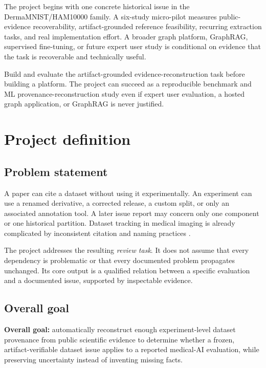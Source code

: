 \documentclass[11pt,a4paper]{article}
\begin{document}
The project begins with one concrete historical issue in the DermaMNIST/HAM10000 family. A six-study micro-pilot measures public-evidence recoverability, artifact-grounded reference feasibility, recurring extraction tasks, and real implementation effort. A broader graph platform, GraphRAG, supervised fine-tuning, or future expert user study is conditional on evidence that the task is recoverable and technically useful.

\begin{decisionbox}[title=Current commitment]
Build and evaluate the artifact-grounded evidence-reconstruction task before building a platform. The project can succeed as a reproducible benchmark and ML provenance-reconstruction study even if expert user evaluation, a hosted graph application, or GraphRAG is never justified.
\end{decisionbox}

\clearpage
\tableofcontents
\clearpage
{}

\section{Project definition}
\label{sec:project}
\subsection{Problem statement}
A paper can cite a dataset without using it experimentally. An experiment can use a renamed derivative, a corrected release, a custom split, or only an associated annotation tool. A later issue report may concern only one component or one historical partition. Dataset tracking in medical imaging is already complicated by inconsistent citation and naming practices \cite{sourget2024,copycats}.

The project addresses the resulting \emph{review task}. It does not assume that every dependency is problematic or that every documented problem propagates unchanged. Its core output is a qualified relation between a specific evaluation and a documented issue, supported by inspectable evidence.

\subsection{Overall goal}
\textbf{Overall goal:} automatically reconstruct enough experiment-level dataset provenance from public scientific evidence to determine whether a frozen, artifact-verifiable dataset issue applies to a reported medical-AI evaluation, while preserving uncertainty instead of inventing missing facts.
\end{document}
